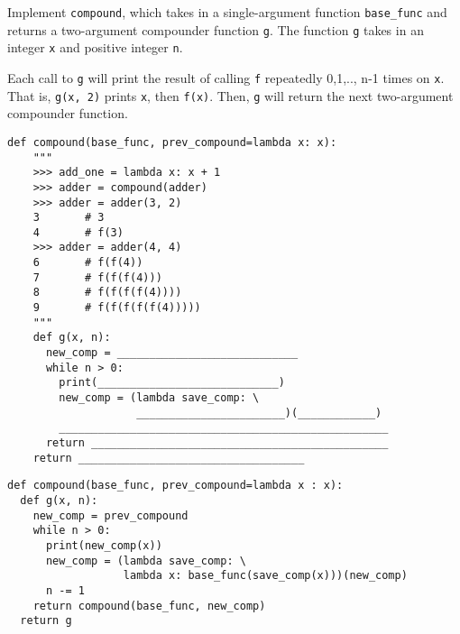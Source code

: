 
\begin{blocksection}
\question Implement \texttt{compound}, which takes in a single-argument function \texttt{base\_func} and returns a two-argument compounder function \texttt{g}. The function \texttt{g} takes in an integer \texttt{x} and positive integer \texttt{n}.

Each call to \texttt{g} will print the result of calling \texttt{f} repeatedly 0,1,.., n-1 times on \texttt{x}. That is, \texttt{g(x, 2)} prints \texttt{x}, then \texttt{f(x)}. Then, \texttt{g} will return the next two-argument compounder function.

\begin{lstlisting}
def compound(base_func, prev_compound=lambda x: x):
    """
    >>> add_one = lambda x: x + 1
    >>> adder = compound(adder)
    >>> adder = adder(3, 2)
    3       # 3
    4       # f(3)
    >>> adder = adder(4, 4)
    6       # f(f(4))
    7       # f(f(f(4)))
    8       # f(f(f(f(4))))
    9       # f(f(f(f(f(4)))))
    """
    def g(x, n):
      new_comp = ____________________________
      while n > 0:
        print(____________________________)
        new_comp = (lambda save_comp: \
                    _______________________)(____________)
        ___________________________________________________
      return ______________________________________________
    return ___________________________________  
\end{lstlisting}

\begin{solution}[1in]
\begin{lstlisting}
def compound(base_func, prev_compound=lambda x : x):
  def g(x, n):
    new_comp = prev_compound
    while n > 0:
      print(new_comp(x))
      new_comp = (lambda save_comp: \
                  lambda x: base_func(save_comp(x)))(new_comp)
      n -= 1
    return compound(base_func, new_comp)
  return g
\end{lstlisting}
\end{solution}
\end{blocksection}